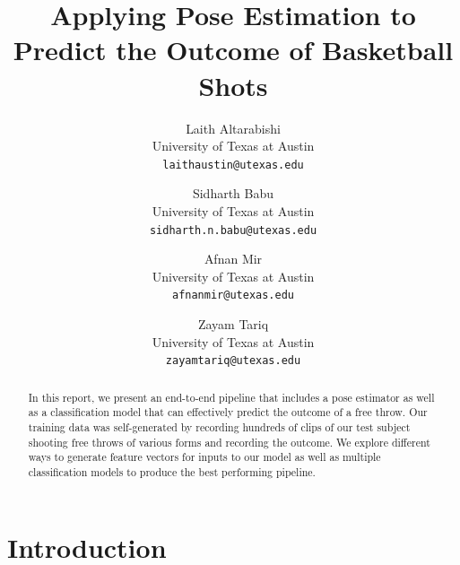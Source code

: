 \documentclass[10pt,twocolumn,letterpaper]{article}
\begin{document}
\title{Applying Pose Estimation to Predict the Outcome of Basketball Shots}

\author{Laith Altarabishi\\
University of Texas at Austin\\
{\tt\small laithaustin@utexas.edu}
\and
Sidharth Babu\\
University of Texas at Austin\\
{\tt\small sidharth.n.babu@utexas.edu}
\and
Afnan Mir \\
University of Texas at Austin\\
{\tt\small afnanmir@utexas.edu}
\and
Zayam Tariq \\
University of Texas at Austin\\
{\tt\small zayamtariq@utexas.edu}
}
\maketitle

\begin{abstract}
  In this report, we present an end-to-end pipeline that includes a pose estimator as well as 
  a classification model that can effectively predict the outcome of a free throw. Our training data was
  self-generated by recording hundreds of clips of our test subject shooting free throws of various forms
  and recording the outcome. We explore different ways to generate feature vectors for inputs to our model as 
  well as multiple classification models to produce the best performing pipeline.
\end{abstract}


\section{Introduction}
\label{sec:intro}
\end{document}
